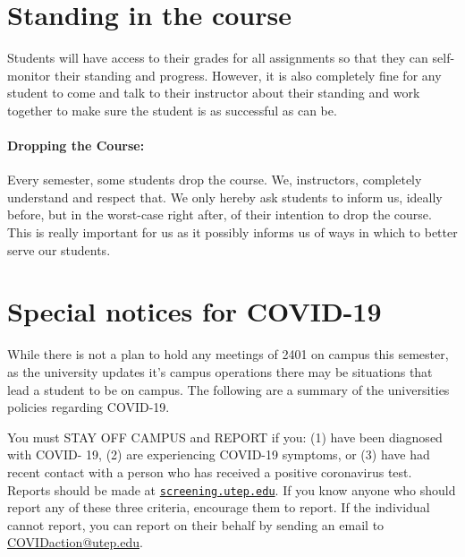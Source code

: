 \documentclass[12pt]{scrartcl}
\begin{document}
\section{Standing in the course}

Students will have access to their grades for all assignments so that they can self-monitor their standing and progress. 
However, it is also completely fine for any student to come and talk to their instructor about their standing and work together to make sure the student is as successful as can be.

\paragraph{Dropping the Course:} 
Every semester, some students drop the course. We, instructors, completely understand and respect that. We only hereby ask students to inform us, ideally before, but in the worst-case right after, of their intention to drop the course. This is really important for us as it possibly informs us of ways in which to better serve our students.


\section{Special notices for COVID-19}

While there is not a plan to hold any meetings of 2401 on campus this semester, 
as the university updates it's campus operations there may be situations that lead a student to be on campus. 
The following are a summary of the universities policies regarding COVID-19.

You must STAY OFF CAMPUS and REPORT if you:
(1) have been diagnosed with COVID- 19, 
(2) are experiencing COVID-19 symptoms, or 
(3) have had recent contact with a person who has received a positive coronavirus test. 
Reports should be made at \href{http://screening.utep.edu}{\texttt{screening.utep.edu}}. 
If you know anyone who should report any of these three criteria, encourage them to report. 
If the individual cannot report, you can report on their behalf by sending an email to \url{COVIDaction@utep.edu}.
\end{document}

